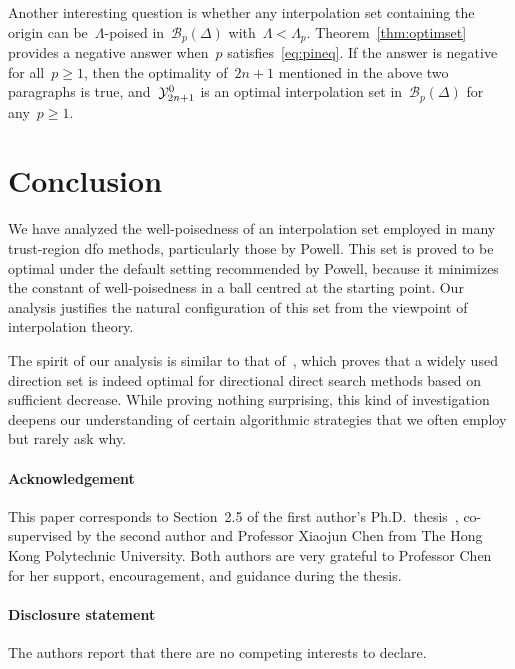 \documentclass{article}
\numberwithin{equation}{section}
\theoremstyle{definition}
\theoremstyle{plain}
\theoremstyle{remark}
\newcommand*{\solvername}[1]{\textsc{#1}\xspace}
\newcommand*{\xpt}[1][]{\mathcal{Y}\ifblank{#1}{}{^{#1}}}
\begin{document}
Another interesting question is whether any interpolation set containing the origin can be~\mbox{$\Lambda$-poised} in~$\mathcal{B}_p(\Delta)$ with~$\Lambda < \Lambda_p$.
Theorem~\ref{thm:optimset} provides a negative answer when~$p$ satisfies~\eqref{eq:pineq}.
If the answer is negative for all~$p\ge 1$, then the optimality of~$2n+1$ mentioned in the above two paragraphs is true, and~$\xpt[0]_{2n+1}$ is an optimal interpolation set in~$\mathcal{B}_p(\Delta)$ for any~$p\ge 1$.



\section{Conclusion}
\label{sec:conclusion}

We have analyzed the well-poisedness of an interpolation set employed in many trust-region \gls{dfo} methods, particularly those by Powell.
This set is proved to be optimal under the default setting recommended by Powell, because it minimizes the constant of well-poisedness in a ball centred at the starting point.
Our analysis justifies the natural configuration of this set from the viewpoint of interpolation theory.

The spirit of our analysis is similar to that of~\cite{Dodangeh_Vicente_Zhang_2016}, which proves that a widely used direction set is indeed optimal for directional direct search methods
based on sufficient decrease. While proving nothing surprising, this kind of investigation deepens our understanding of certain algorithmic strategies that we often employ but rarely ask why.

\paragraph*{Acknowledgement}
This paper corresponds to Section~2.5 of the first author's Ph.D.~thesis~\cite{Ragonneau_2022}, co-supervised by the second author and Professor Xiaojun Chen from The Hong Kong Polytechnic University.
Both authors are very grateful to Professor Chen for her support, encouragement, and guidance during the thesis.

\paragraph*{Disclosure statement}
The authors report that there are no competing interests to declare.
\end{document}
